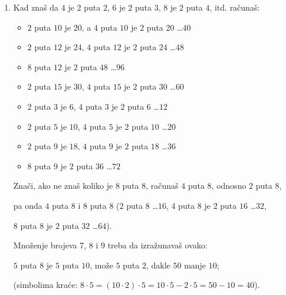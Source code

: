     \begin{enumerate}

        \item Kad zna\v s da $4$ je $2$ puta $2$, $6$ je $2$ puta $3$, $8$ je $2$ puta $4$, itd. ra\v cuna\v s:

        \begin{itemize}

            \item $2$ puta $10$ je $20$, a $4$ puta $10$ je $2$ puta $20$ \dots $40$

            \item $2$ puta $12$ je $24$, $4$ puta $12$ je $2$ puta $24$ \dots $48$

            \item $8$ puta $12$ je $2$ puta $48$ \dots $96$

            \item $2$ puta $15$ je $30$, $4$ puta $15$ je $2$ puta $30$ \dots $60$

            \item $2$ puta $3$ je $6$, $4$ puta $3$ je $2$ puta $6$ \dots $12$

            \item $2$ puta $5$ je $10$, $4$ puta $5$ je $2$ puta $10$ \dots $20$

            \item $2$ puta $9$ je $18$, $4$ puta $9$ je $2$ puta $18$ \dots $36$

            \item $8$ puta $9$ je $2$ puta $36$ \dots $72$

        \end{itemize}

        Zna\v ci, ako ne zna\v s koliko je $8$ puta $8$, ra\v cuna\v s $4$ puta $8$, odnosno $2$ puta $8$,

        pa onda $4$ puta $8$ i $8$ puta $8$ ($2$ puta $8$ \dots $16$, $4$ puta $8$ je $2$ puta $16$ \dots $32$,

        $8$ puta $8$ je $2$ puta $32$ \dots $64$).



        Mno\v zenje brojeva $7$, $8$ i $9$ treba da izra\v zunava\v s ovako:



        $5$ puta $8$ je $5$ puta $10$, mo\v ze $5$ puta $2$, dakle $50$ manje $10$;

        (simbolima kra\' ce: $8 \cdot 5 = (10 \cdot 2) \cdot 5 = 10 \cdot 5 - 2 \cdot 5 = 50 - 10 = 40$).




\end{enumerate}
